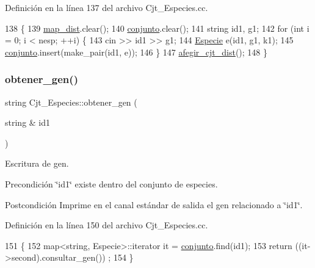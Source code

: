 Definición en la línea 137 del archivo Cjt\+\_\+\+Especies.\+cc.


\begin{DoxyCode}
138 \{
139     \hyperlink{class_cjt___especies_a9b104014aea0c1472ba4e7d7fc785e9a}{map\_dist}.clear();
140     \hyperlink{class_cjt___especies_a82ed53cbd620caca3db6b5c20b37a60a}{conjunto}.clear();
141     \textcolor{keywordtype}{string} id1, g1;
142     \textcolor{keywordflow}{for} (\textcolor{keywordtype}{int} i = 0; i < nesp; ++i) \{
143         cin >> id1 >> g1;
144         \hyperlink{class_especie}{Especie} e(id1, g1, k1);
145         \hyperlink{class_cjt___especies_a82ed53cbd620caca3db6b5c20b37a60a}{conjunto}.insert(make\_pair(id1, e));
146     \}
147     \hyperlink{class_cjt___especies_a32f9d2fb3c0cf9800d6d7492977beea6}{afegir\_cjt\_dist}();
148 \}
\end{DoxyCode}
\mbox{\label{class_cjt___especies_a4cc8f3f5c7f0eadbb19526bbc1ab10bc}} 
\subsubsection{\texorpdfstring{obtener\+\_\+gen()}{obtener\_gen()}}
{\footnotesize\ttfamily string Cjt\+\_\+\+Especies\+::obtener\+\_\+gen (\begin{DoxyParamCaption}\item[{string \&}]{id1 }\end{DoxyParamCaption})}



Escritura de gen. 

\begin{DoxyPrecond}{Precondición}
\char`\"{}id1\char`\"{} existe dentro del conjunto de especies. 
\end{DoxyPrecond}
\begin{DoxyPostcond}{Postcondición}
Imprime en el canal estándar de salida el gen relacionado a \char`\"{}id1\char`\"{}. 
\end{DoxyPostcond}


Definición en la línea 150 del archivo Cjt\+\_\+\+Especies.\+cc.


\begin{DoxyCode}
151 \{
152     map<string, Especie>::iterator it = \hyperlink{class_cjt___especies_a82ed53cbd620caca3db6b5c20b37a60a}{conjunto}.find(id1);
153     \textcolor{keywordflow}{return} ((it->second).consultar\_gen()) ;
154 \}
\end{DoxyCode}
\mbox{\label{class_cjt___especies_a61b0168970e926d3a27faf3f31ad2869}} 
